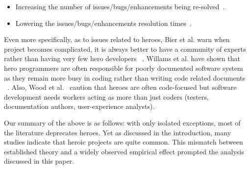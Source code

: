 \documentclass[sigconf,review]{acmart}
\newcommand{\bi}{\begin{itemize}}
\newcommand{\ei}{\end{itemize}}
\begin{document}
\bi
\item Increasing the number of issues/bugs/enhancements being re-solved~\cite{mockus2002two,jarczyk2014github,bissyande2013got,athanasiou2014test,gupta2014process,reyes2017analyzing}.
\item Lowering the issues/bugs/enhancements resolution times~\cite{jarczyk2014github}.
\ei
Even more specifically, as to issues related to heroes, Bier et al. warn when project becomes complicated, it is always better to have a community of experts rather than having very few hero developers ~\cite{bier2011online}. Willams et al. have shown that hero programmers are often responsible for poorly documented software system as they remain more busy in coding rather than writing code related documents ~\cite{hislop2002integrating}.  Also, Wood et al.~\cite{wood2005multiview} caution that heroes are often code-focused but software development needs workers acting as more than just coders (testers, documentation authors, user-experience analysts).

Our summary of the above is as follows: with only isolated exceptions, most of the literature deprecates heroes. Yet as discussed in the introduction,
many studies indicate that heroic projects are quite common. This mismatch between
established theory and a widely observed empirical effect prompted the analysis
discussed in this paper.
 
\end{document}
